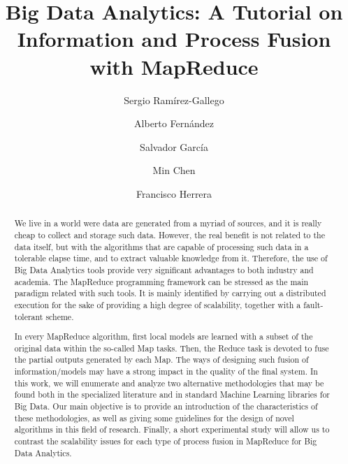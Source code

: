 \documentclass[3p,review]{elsarticle}
\begin{document}
	
	\begin{frontmatter}
		
		\title{Big Data Analytics: A Tutorial on Information and Process Fusion with MapReduce}
		
		\author[grx]{Sergio Ram\'irez-Gallego}
		
		\author[grx]{Alberto Fern\'andez}
		
		\author[grx]{Salvador Garc\'ia}
		
		\author[chi]{Min Chen}
		
		\author[grx]{Francisco Herrera}
		
		\address[grx]{Department of Computer Science and Artificial Intelligence, University of Granada, Granada, Spain}
		\address[chi]{School of Computer Science and Technology, Huazhong University of Science and Technology, Wuhan, China}
		
		
		
		\begin{abstract}
			
			We live in a world were data are generated from a myriad of sources, and it is really cheap to collect and storage such data. However, the real benefit is not related to the data itself, but with the algorithms that are capable of processing such data in a tolerable elapse time, and to extract valuable knowledge from it. Therefore, the use of Big Data Analytics tools provide very significant advantages to both industry and academia. The MapReduce programming framework can be stressed as the main paradigm related with such tools. It is mainly identified by carrying out a distributed execution for the sake of providing a high degree of scalability, together with a fault-tolerant scheme. 
			
			In every MapReduce algorithm, first local models are learned with a subset of the original data within the so-called Map tasks. Then, the Reduce task is devoted to fuse the partial outputs generated by each Map. The ways of designing such fusion of information/models may have a strong impact in the quality of the final system. In this work, we will enumerate and analyze two alternative methodologies that may be found both in the specialized literature and in standard Machine Learning libraries for Big Data. Our main objective is to provide an introduction of the characteristics of these methodologies, as well as giving some guidelines for the design of novel algorithms in this field of research.  Finally, a short experimental study will allow us to contrast the scalability issues for each type of process fusion in MapReduce for Big Data Analytics.
			

\end{abstract}
\end{frontmatter}
\end{document}
